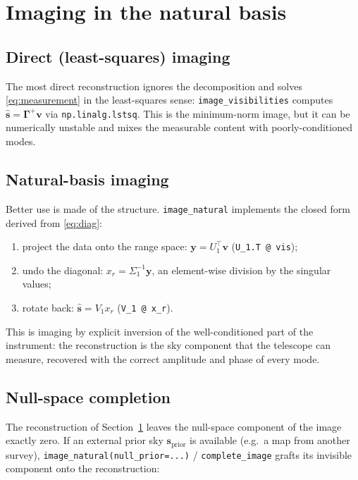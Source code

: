 \documentclass[11pt,a4paper]{article}
\newcommand{\Gammam}{\boldsymbol{\Gamma}}
\newcommand{\svec}{\boldsymbol{s}}
\newcommand{\vvec}{\boldsymbol{v}}
\begin{document}
\section{Imaging in the natural basis}
\label{sec:natural}

\subsection{Direct (least-squares) imaging}

The most direct reconstruction ignores the decomposition and solves
\eqref{eq:measurement} in the least-squares sense:
\texttt{image\_visibilities} computes
$\hat{\svec}=\Gammam^{+}\vvec$ via \texttt{np.linalg.lstsq}. This is the
minimum-norm image, but it can be numerically unstable and mixes the measurable
content with poorly-conditioned modes.

\subsection{Natural-basis imaging}

Better use is made of the structure. \texttt{image\_natural} implements the
closed form derived from \eqref{eq:diag}:

\begin{enumerate}
  \item project the data onto the range space: $\boldsymbol{y}=U_1^{\!\top}\vvec$
        (\texttt{U\_1.T @ vis});
  \item undo the diagonal: $x_r=\Sigma_1^{-1}\boldsymbol{y}$, an
        element-wise division by the singular values;
  \item rotate back: $\hat{\svec}=V_1 x_r$
        (\texttt{V\_1 @ x\_r}).
\end{enumerate}

This is imaging by explicit inversion of the well-conditioned part of the
instrument: the reconstruction is the sky component that the telescope can
measure, recovered with the correct amplitude and phase of every mode.

\subsection{Null-space completion}

The reconstruction of Section~\ref{sec:natural} leaves the null-space
component of the image exactly zero. If an external prior sky
$\svec_{\mathrm{prior}}$ is available (e.g.\ a map from another survey),
\texttt{image\_natural(null\_prior=...)} / \texttt{complete\_image} grafts its
invisible component onto the reconstruction:
\end{document}
